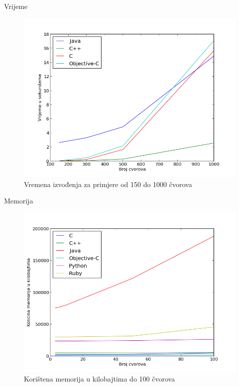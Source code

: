\documentclass[utf8]{beamer}
\begin{document}
\begin{frame}{Vrijeme}
\begin{figure}
\centering
\includegraphics[scale=0.45]{../Dokumentacija/img/Primjeri_150_1000.png}
\caption{Vremena izvođenja za primjere od 150 do 1000 čvorova}
\label{fig:time_150_1000}
\end{figure}
\end{frame}

\begin{frame}{Memorija}

\begin{figure}
\centering
\includegraphics[scale=0.45]{../Dokumentacija/img/memorija_100.png}
\caption{Korištena memorija u kilobajtima do 100 čvorova}
\label{fig:memorija_100}
\end{figure}

\end{frame}
\end{document}

